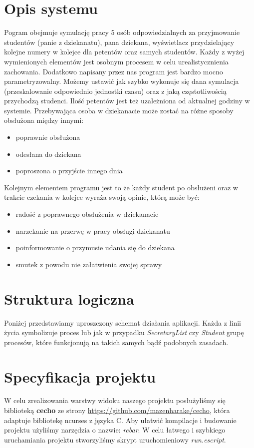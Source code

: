 \documentclass[a4paper,12pt]{article}
\begin{document}
\section{Opis systemu}

 Pogram obejmuje symulację pracy 5 osób odpowiedzialnych za przyjmowanie studentów (panie z dziekanatu), pana dziekana, wyświetlacz przydzielający kolejne numery w kolejce dla petentów oraz samych studentów.
 Każdy z wyżej wymienionych elementów jest osobnym procesem w celu urealistycznienia zachowania.
 Dodatkowo napisany przez nas program jest bardzo mocno parametryzowalny.  Możemy ustawić jak szybko wykonuje się dana symulacja (przeskalowanie odpowiednio jednostki czasu) oraz z jaką częstotliwością przychodzą studenci. Ilość petentów jest też uzależniona od aktualnej godziny w systemie. Przebywająca osoba w dziekanacie może zostać na różne sposoby obsłużona między innymi:
 
 \begin{itemize}
 	\item poprawnie obsłużona
 	\item odesłana do dziekana
 	\item poproszona o przyjście innego dnia
 \end{itemize}
 
Kolejnym elementem programu jest to że każdy student po obsłużeni oraz w trakcie czekania w kolejce wyraża swoją opinie, którą może być:
 \begin{itemize}
	\item radość z poprawnego obsłużenia w dziekanacie
	\item narzekanie na przerwę w pracy obsługi dziekanatu
	\item poinformowanie o przymusie udania się do dziekana
	\item smutek z powodu nie załatwienia swojej sprawy
\end{itemize}

\section{Struktura logiczna}
	Poniżej przedstawiamy uproszczony schemat działania aplikacji.
	Każda z linii życia symbolizuje proces lub jak w przypadku \textit{SecretaryList} czy \textit{Student} grupę procesów, które funkcjonują na takich samych bądź podobnych zasadach.
	

	


\section{Specyfikacja projektu}
	W celu zrealizowania warstwy widoku naszego projektu posłużyliśmy się biblioteką \nobreak \textbf{cecho} ze strony \url{https://github.com/mazenharake/cecho}, która adaptuje bibliotekę ncurses z języka C. 
	Aby ułatwić kompilacje i budowanie projektu użyliśmy narzędzia o nazwie: \textit{rebar}.
	W celu łatwego i szybkiego uruchamiania projektu stworzyliśmy skrypt uruchomieniowy \textit{run.escript}.
	
\end{document}
